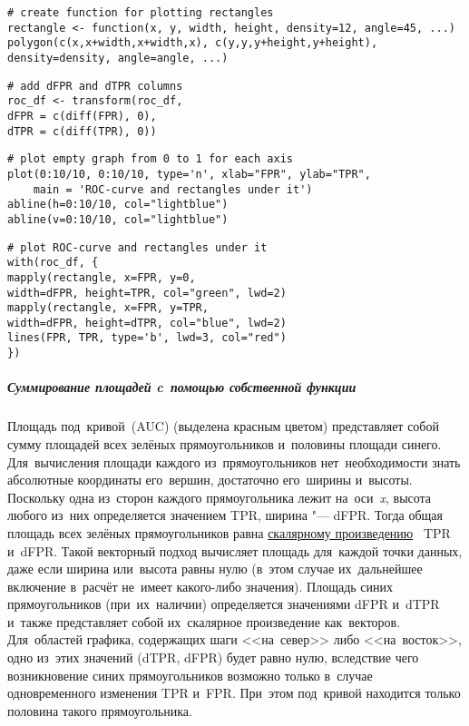 \documentclass[]{scrreprt}
\begin{document}
%
\begin{lstlisting}[float, caption = Создание функции \textbf{rectangle}, firstnumber=1, label= lst:create-rectangle-function-r]
# create function for plotting rectangles
rectangle <- function(x, y, width, height, density=12, angle=45, ...) 
polygon(c(x,x+width,x+width,x), c(y,y,y+height,y+height), 
density=density, angle=angle, ...)
\end{lstlisting}
%
\begin{lstlisting}[float, caption = Добавление столбцов dFPR и~dTPR, firstnumber=1, label= lst:add-dFPR&dTPR-columns-r]
# add dFPR and dTPR columns
roc_df <- transform(roc_df, 
dFPR = c(diff(FPR), 0),
dTPR = c(diff(TPR), 0))
\end{lstlisting}
%
\begin{lstlisting}[float, caption = Построение пустого графа и~разметка осей от~0 до~1, firstnumber=1, label= lst:plot-empty-graph-from-0-to-1-r]
# plot empty graph from 0 to 1 for each axis
plot(0:10/10, 0:10/10, type='n', xlab="FPR", ylab="TPR",
	main = 'ROC-curve and rectangles under it')
abline(h=0:10/10, col="lightblue")
abline(v=0:10/10, col="lightblue")
\end{lstlisting}
%
\begin{lstlisting}[float, caption = Построение ROC-кривой и~прямоугольников под~ней, firstnumber=1, label= lst:plot-ROC-curve-and-rectangles-under-it-r]
# plot ROC-curve and rectangles under it
with(roc_df, {
mapply(rectangle, x=FPR, y=0,   
width=dFPR, height=TPR, col="green", lwd=2)
mapply(rectangle, x=FPR, y=TPR, 
width=dFPR, height=dTPR, col="blue", lwd=2)
lines(FPR, TPR, type='b', lwd=3, col="red")
})
\end{lstlisting}
%

\subparagraph{Суммирование площадей c~помощью собственной функции}
Площадь под~кривой~(AUC) (выделена красным цветом) представляет собой сумму площадей всех зелёных прямоугольников и~половины площади синего. Для~вычисления площади каждого из~прямоугольников нет~необходимости знать абсолютные координаты его~вершин, достаточно его~ширины и~высоты. Поскольку одна из~сторон каждого прямоугольника лежит на~оси~\textit{x}, высота любого из~них определяется значением TPR, ширина "--- dFPR. Тогда общая площадь всех зелёных прямоугольников равна \href{https://en.wikipedia.org/wiki/Dot_product}{скалярному произведению}~\cite{Wiki:dot-product} TPR и~dFPR. Такой векторный подход вычисляет площадь для~каждой точки данных, даже если ширина или~высота равны нулю (в~этом случае их~дальнейшее включение в~расчёт не~имеет какого-либо значения). Площадь синих прямоугольников (при~их~наличии) определяется значениями dFPR и~dTPR и~также представляет собой их~скалярное произведение как~векторов. Для~областей графика, содержащих шаги <<на~север>> либо <<на~восток>>, одно из~этих значений (dTPR, dFPR) будет равно нулю, вследствие чего возникновение синих прямоугольников возможно только в~случае одновременного изменения TPR и~FPR. При~этом под~кривой находится только половина такого прямоугольника.
\end{document}
